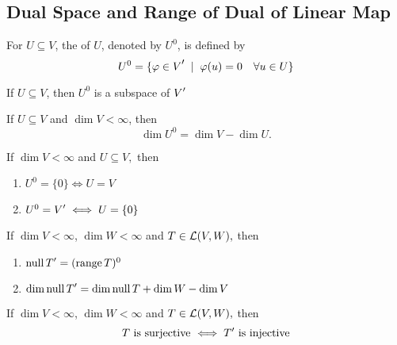 \subsection{Dual Space and Range of Dual of Linear Map}

\begin{mydef} [annihilator, $U^0$]
  \label{def: annihiltator}
  For $U \subseteq V$, the  of $U$, denoted by $U^{0}$, is defined by
  \begin{equation}
    U^0 = \{ \varphi \in \dual{V} \; \mid \; \varphi (u) = 0 \quad \forall u \in U \}
  \end{equation}
\end{mydef}

\setcounter{thm}{123}
\begin{thm}
  \label{thm: the annihilator is a subspace}
  If $U \subseteq V$, then $U^{0}$ is a subspace of $\dual{V}$
\end{thm}

\setcounter{thm}{124}
\begin{thm} 
    If $U\subseteq V$ and $\dim V < \infty$, then
    \begin{equation}
      \dim U^0 = \dim V - \dim U.
    \end{equation}
\end{thm}

\setcounter{thm}{126}
\begin{thm} 
  If $\dim V < \infty$ and $U\subseteq V,$ then
  \begin{enumerate}
    \item $U^0 = \{0 \} \iff U = V$
    \item $U^0 = \dual{V} \iff U = \{0\}$
   \end{enumerate}
\end{thm}

\begin{thm}
  If $\dim V < \infty$, $\dim W<\infty$ and $T \in \mathcal{L} (V,W),$ then
  \begin{enumerate}
    \item $\mynull \dual{T} = (\myrange T)^0$
    \item $\dim \mynull \dual{T} = \dim \mynull T + \dim W - \dim V$
  \end{enumerate}
\end{thm}

\begin{thm}
    If $\dim V < \infty$, $\dim W<\infty$ and $T \in \mathcal{L} (V,W),$ then
  \begin{equation}
    T$ is surjective $ \iff \dual{T} $ is injective$
  \end{equation}
\end{thm}

